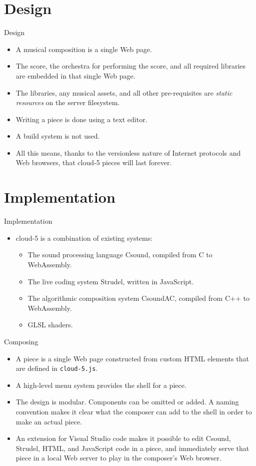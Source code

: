 \documentclass{beamer}
\begin{document}
\section{Design}

\begin{frame}{Design}
\begin{itemize}
\item A musical composition is a single Web page.
\item The score, the orchestra for performing the score, and all required libraries are embedded in that single Web page.
\item The libraries, any musical assets, and all other pre-requisites are \emph{static resources} on the server filesystem.
\item Writing a piece is done using a text editor.
\item A build system is not used.
\item All this means, thanks to the versionless nature of Internet protocols and Web browsers, that cloud-5 pieces will last forever.
\end{itemize}
\end{frame}

\section{Implementation}
\begin{frame}{Implementation}
\begin{itemize}
\item cloud-5 is a combination of existing systems:
\begin{itemize}
\item The sound processing language Csound, compiled from C to WebAssembly.
\item The live coding system Strudel, written in JavaScript.
\item The algorithmic composition system CsoundAC, compiled from C++ to WebAssembly.
\item GLSL shaders.
\end{itemize}
\end{itemize}
\end{frame}

\begin{frame}{Composing}
\begin{itemize}
\item A piece is a single Web page constructed from custom HTML elements that are defined in \texttt{cloud-5.js}.
\item A high-level menu system provides the shell for a piece.
\item The design is modular. Components can be omitted or added. A naming convention makes it clear what the composer can add to the shell in order to make an actual piece.
\item An extension for Visual Studio code makes it possible to edit Csound, Strudel, HTML, and JavaScript code in a piece, and immediately serve that piece in a local Web server to play in the composer's Web browser.
\end{itemize}
\end{frame}
\end{document}
